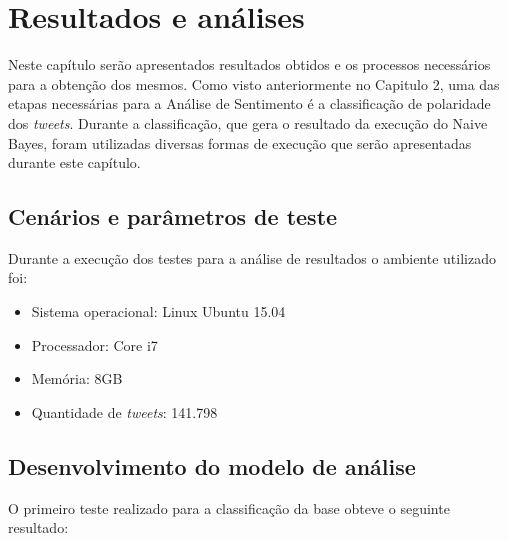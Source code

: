 \chapter{Resultados e análises}\label{cap:resultados}

Neste capítulo serão apresentados resultados obtidos e os processos necessários para a obtenção dos mesmos. Como visto anteriormente no Capitulo 2,  uma das etapas
necessárias para a Análise de Sentimento é a classificação de polaridade dos \textit{tweets}. Durante a classificação, que gera o resultado da execução do Naive Bayes, foram utilizadas diversas formas de execução que serão apresentadas durante este capítulo.

\section{Cenários e parâmetros de teste}\label{sec:cenarios}
Durante a execução dos testes para a análise de resultados o ambiente utilizado foi:
\begin{itemize}
	\item Sistema operacional: Linux Ubuntu 15.04
	\item Processador: Core i7
	\item Memória: 8GB
	\item Quantidade de \textit{tweets}: 141.798
\end{itemize}


\section{Desenvolvimento do modelo de análise}\label{sec:desenv-moda}
O primeiro teste realizado para a classificação da base obteve o seguinte resultado:
\begin{table}[]
	\caption{1º teste}
	\label{teste-1}
\end{table}


